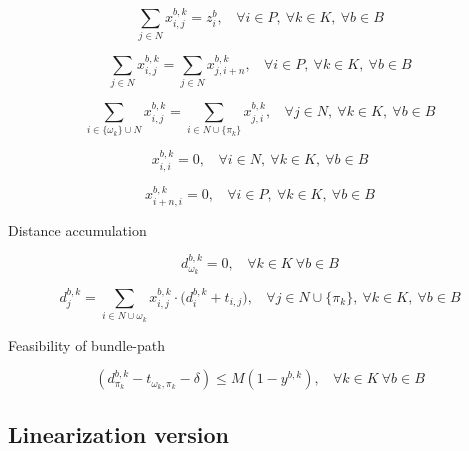 \documentclass[12pt ]{article}
\begin{document}
\begin{equation}
	\sum_{ j \in N } x_{i,j}^{b,k} = z_{i}^{b},~~~~\forall i \in P,~\forall k \in K,~\forall b \in B
	\label{eq:taskMembership_flowEnforcement}
\end{equation}

\begin{equation}
	\sum_{ j \in N } x_{i,j}^{b,k} = \sum_{ j \in N } x_{j,i+n}^{b,k},~~~~\forall i \in P,~\forall k \in K,~\forall b \in B
	\label{eq:pickupDeliveryConservation}
\end{equation}

\begin{equation}
	\sum_{ i \in \{ \omega_{k} \} \cup N} x_{i,j}^{b,k} = \sum_{ i \in N \cup \{ \pi_{k} \} } x_{j,i}^{b,k},~~~~\forall j \in N,~\forall k \in K,~\forall b \in B
	\label{eq:flowConservation}
\end{equation}

\begin{equation}
	x_{i,i}^{b,k} = 0,~~~~\forall i \in N,~\forall k \in K,~\forall b \in B
	\label{eq:zeroFlow}
\end{equation}

\begin{equation}
	x_{i + n,i}^{b,k} = 0,~~~~\forall i \in P,~\forall k \in K,~\forall b \in B
	\label{eq:reverseFlow}
\end{equation}


\noindent Distance accumulation

\begin{equation}
	d_{\omega_k}^{b,k} = 0,~~~~\forall k \in K~\forall b \in B
	\label{eq:initBeginningDistance}
\end{equation}

\begin{equation}
	d_{j}^{b,k} = \sum_{ i \in N \cup \omega_k} x_{i,j}^{b,k} \cdot \big( d_i^{b,k} + t_{i,j} \big),~~~~\forall j \in N \cup \{ \pi_{k} \},~\forall k \in K,~\forall b \in B
	\label{eq:calcAccumulatedDistance}
\end{equation}

\noindent Feasibility of bundle-path

\begin{equation} 
	(d_{\pi_k}^{b, k} - t_{\omega_k, \pi_k} - \delta) \le M (1 - y^{b, k}),~~~~\forall k \in K~\forall b \in B
	\label{eq:accumulatedDistanceFeasibility}
\end{equation}


\subsection{Linearization version}
\end{document}
